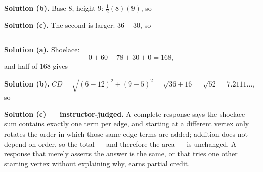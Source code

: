 \documentclass[12pt]{article}
\begin{document}
\noindent\textbf{Solution (b).} Base $8$, height $9$: $\tfrac{1}{2}(8)(9)$, so

\noindent\textbf{Solution (c).} The second is larger: $36 - 30$, so

\vspace{0.15cm}\noindent\rule{\linewidth}{0.2pt}


\noindent\textbf{Solution (a).} Shoelace:
\[ 0 + 60 + 78 + 30 + 0 = 168 , \]
and half of $168$ gives 

\noindent\textbf{Solution (b).} $CD = \sqrt{(6-12)^2 + (9-5)^2}
= \sqrt{36+16} = \sqrt{52} = 7.2111\ldots$, so 

\noindent\textbf{Solution (c) --- instructor-judged.} A complete response says
the shoelace sum contains exactly one term per edge, and starting at a different
vertex only rotates the order in which those same edge terms are added; addition
does not depend on order, so the total --- and therefore the area --- is
unchanged. A response that merely asserts the answer is the same, or that tries
one other starting vertex without explaining why, earns partial credit.
\end{document}
